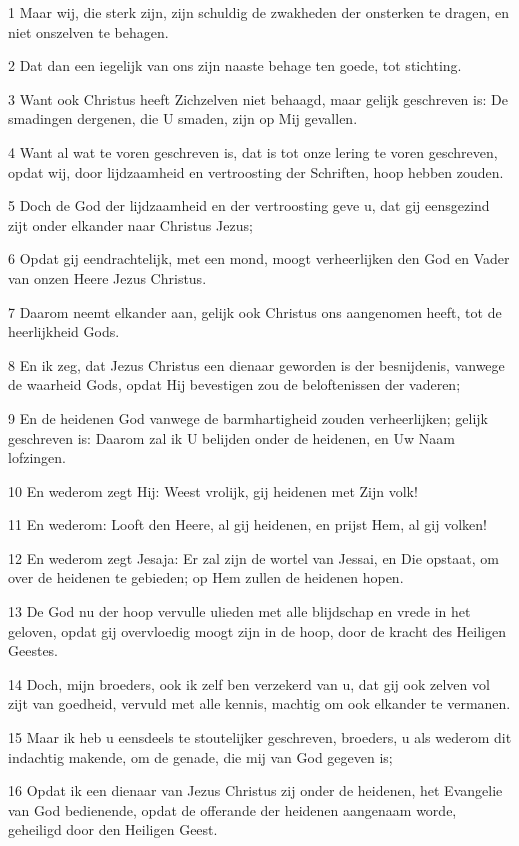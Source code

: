 \par 1 Maar wij, die sterk zijn, zijn schuldig de zwakheden der onsterken te dragen, en niet onszelven te behagen.
\par 2 Dat dan een iegelijk van ons zijn naaste behage ten goede, tot stichting.
\par 3 Want ook Christus heeft Zichzelven niet behaagd, maar gelijk geschreven is: De smadingen dergenen, die U smaden, zijn op Mij gevallen.
\par 4 Want al wat te voren geschreven is, dat is tot onze lering te voren geschreven, opdat wij, door lijdzaamheid en vertroosting der Schriften, hoop hebben zouden.
\par 5 Doch de God der lijdzaamheid en der vertroosting geve u, dat gij eensgezind zijt onder elkander naar Christus Jezus;
\par 6 Opdat gij eendrachtelijk, met een mond, moogt verheerlijken den God en Vader van onzen Heere Jezus Christus.
\par 7 Daarom neemt elkander aan, gelijk ook Christus ons aangenomen heeft, tot de heerlijkheid Gods.
\par 8 En ik zeg, dat Jezus Christus een dienaar geworden is der besnijdenis, vanwege de waarheid Gods, opdat Hij bevestigen zou de beloftenissen der vaderen;
\par 9 En de heidenen God vanwege de barmhartigheid zouden verheerlijken; gelijk geschreven is: Daarom zal ik U belijden onder de heidenen, en Uw Naam lofzingen.
\par 10 En wederom zegt Hij: Weest vrolijk, gij heidenen met Zijn volk!
\par 11 En wederom: Looft den Heere, al gij heidenen, en prijst Hem, al gij volken!
\par 12 En wederom zegt Jesaja: Er zal zijn de wortel van Jessai, en Die opstaat, om over de heidenen te gebieden; op Hem zullen de heidenen hopen.
\par 13 De God nu der hoop vervulle ulieden met alle blijdschap en vrede in het geloven, opdat gij overvloedig moogt zijn in de hoop, door de kracht des Heiligen Geestes.
\par 14 Doch, mijn broeders, ook ik zelf ben verzekerd van u, dat gij ook zelven vol zijt van goedheid, vervuld met alle kennis, machtig om ook elkander te vermanen.
\par 15 Maar ik heb u eensdeels te stoutelijker geschreven, broeders, u als wederom dit indachtig makende, om de genade, die mij van God gegeven is;
\par 16 Opdat ik een dienaar van Jezus Christus zij onder de heidenen, het Evangelie van God bedienende, opdat de offerande der heidenen aangenaam worde, geheiligd door den Heiligen Geest.
